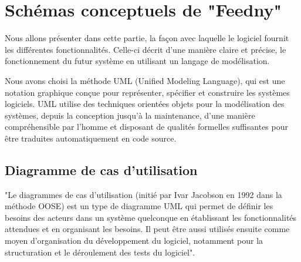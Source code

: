\section{Schémas conceptuels de "Feedny"}
Nous allons présenter dans cette partie, la façon avec laquelle le logiciel fournit les différentes fonctionnalités. Celle-ci décrit d'une manière claire et précise, le fonctionnement du futur système en utilisant un langage de modélisation. 

Nous avons choisi la méthode UML (Unified Modeling Language), qui est une notation graphique conçue pour représenter, spécifier et construire les systèmes logiciels. UML utilise des techniques orientées objets pour la modélisation des systèmes, depuis la conception jusqu'à la maintenance, d'une manière compréhensible par l'homme et disposant de qualités formelles suffisantes pour être traduites automatiquement en code source.\cite{UML}

\subsection{Diagramme de cas d'utilisation}
"Le diagrammes de cas d'utilisation (initié par Ivar Jacobson en 1992 dans la méthode OOSE) est un type de diagramme UML qui permet de définir les besoins des acteurs dans un système quelconque en établissant les fonctionnalités attendues et en organisant les besoins. Il peut être aussi utilisés ensuite comme moyen d'organisation du développement du logiciel, notamment pour la structuration et le déroulement des tests du logiciel".\cite{UML}

